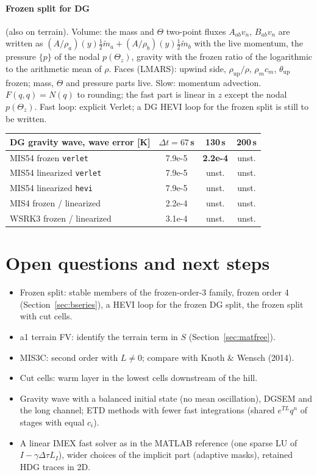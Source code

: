 \documentclass[11pt,a4paper]{article}
\newcommand{\code}[1]{\texttt{#1}}
\newcommand{\dt}{\Delta t}
\begin{document}
\paragraph{Frozen split for DG} (also on terrain). Volume: the mass and $\Theta$ two-point fluxes
$A_{ab}v_n$, $B_{ab}v_n$ are written as $(A/\rho_a)(y)\tfrac12\tilde m_a+(A/\rho_b)(y)\tfrac12\tilde m_b$
with the live momentum, the pressure $\{p\}$ of the nodal $p(\Theta_z)$, gravity with the frozen ratio
of the logarithmic to the arithmetic mean of $\rho$. Faces (LMARS): upwind side, $\rho_\mathrm{up}/\rho$,
$\rho_mc_m$, $\theta_\mathrm{up}$ frozen; mass, $\Theta$ and pressure parts live. Slow: momentum
advection. $F(q,q)=N(q)$ to rounding; the fast part is linear in $z$ except the nodal $p(\Theta_z)$.
Fast loop: explicit Verlet; a DG HEVI loop for the frozen split is still to be written.
\begin{center}
\begin{tabular}{lccc}
\toprule
DG gravity wave, wave error [K] & $\dt=67$\,s & 130\,s & 200\,s\\
\midrule
MIS54 frozen \code{verlet} & 7.9e-5 & \textbf{2.2e-4} & unst.\\
MIS54 linearized \code{verlet} & 7.9e-5 & unst. & unst.\\
MIS54 linearized \code{hevi} & 7.9e-5 & unst. & unst.\\
MIS4 frozen / linearized & 2.2e-4 & unst. & unst.\\
WSRK3 frozen / linearized & 3.1e-4 & unst. & unst.\\
\bottomrule
\end{tabular}
\end{center}

\section{Open questions and next steps}

\begin{itemize}
\item Frozen split: stable members of the frozen-order-3 family, frozen order 4 (Section~\ref{sec:bseries}),
  a HEVI loop for the frozen DG split, the frozen split with cut cells.
\item a1 terrain FV: identify the terrain term in $S$ (Section~\ref{sec:matfree}).
\item MIS3C: second order with $L\ne0$; compare with Knoth \& Wensch (2014).
\item Cut cells: warm layer in the lowest cells downstream of the hill.
\item Gravity wave with a balanced initial state (no mean oscillation), DGSEM and the long channel;
  ETD methods with fewer fast integrations (shared $e^{TL}q^n$ of stages with equal $c_i$).
\item A linear IMEX fast solver as in the MATLAB reference (one sparse LU of $I-\gamma\Delta\tau L_I$),
  wider choices of the implicit part (adaptive masks), retained HDG traces in 2D.
\end{itemize}
\end{document}
